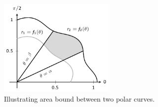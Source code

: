 \begin{figure}[H]
	\begin{center}
			\includegraphics[width=0.5\textwidth]{fig_int_app_6}
	\caption{Illustrating area bound between two polar curves.}
	\label{fig_int_app_6}
	\end{center}
\end{figure}

